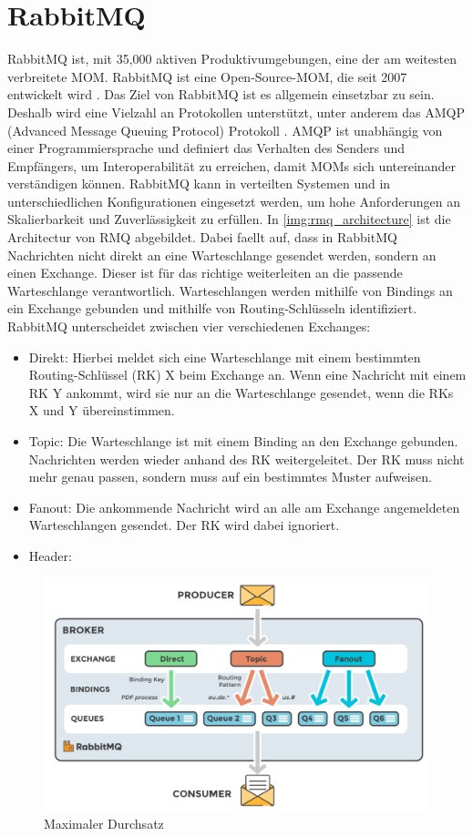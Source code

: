 \section{RabbitMQ}
\label{sec:rmq}
RabbitMQ ist, mit 35,000 aktiven Produktivumgebungen, eine der am weitesten verbreitete MOM. 
RabbitMQ ist eine Open-Source-MOM, die seit 2007 entwickelt wird \cite{rabbitmq}. Das Ziel von RabbitMQ ist es allgemein einsetzbar zu sein. Deshalb wird eine Vielzahl an Protokollen unterstützt, unter anderem das AMQP (Advanced Message Queuing Protocol) Protokoll \cite{amqp}. AMQP ist unabhängig von einer Programmiersprache und definiert das Verhalten des Senders und Empfängers, um Interoperabilität zu erreichen, damit MOMs sich untereinander verständigen können. RabbitMQ kann in verteilten Systemen und in unterschiedlichen Konfigurationen eingesetzt werden, um hohe Anforderungen an Skalierbarkeit und Zuverlässigkeit zu erfüllen. In \autoref{img:rmq_architecture} ist die Architectur von RMQ abgebildet. Dabei faellt auf, dass in RabbitMQ Nachrichten nicht direkt an eine Warteschlange gesendet werden, sondern an einen Exchange. Dieser ist für das richtige weiterleiten an die passende Warteschlange verantwortlich. Warteschlangen werden mithilfe von Bindings an ein Exchange gebunden und mithilfe von Routing-Schlüsseln identifiziert. RabbitMQ unterscheidet zwischen vier verschiedenen Exchanges:
\begin{itemize}
    \item Direkt: Hierbei meldet sich eine Warteschlange mit einem bestimmten Routing-Schlüssel (RK) X beim Exchange an. Wenn eine Nachricht mit einem RK Y ankommt, wird sie nur an die Warteschlange gesendet, wenn die RKs X und Y übereinstimmen.
    \item Topic: Die Warteschlange ist mit einem Binding an den Exchange gebunden. Nachrichten werden wieder anhand des RK weitergeleitet. Der RK muss nicht mehr genau passen, sondern muss auf ein bestimmtes Muster aufweisen.
    \item Fanout: Die ankommende Nachricht wird an alle am Exchange angemeldeten Warteschlangen gesendet. Der RK wird dabei ignoriert.
    \item Header:
\end{itemize}
\begin{figure}
\center
  \includegraphics[width=1\textwidth]{images/rmq_architecture.png}
  \caption{Maximaler Durchsatz}
  \label{img:rmq_architecture}
\end{figure}
